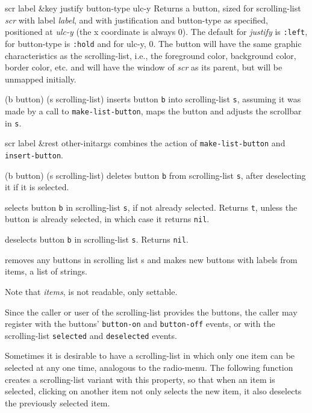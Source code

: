 \documentclass[twoside,openright,11pt]{report}
\newcommand{\tp}[1]{\texttt{#1}}
\begin{document}
{scr label \&key justify button-type ulc-y}
{Returns a button, sized for scrolling-list \emph{scr} with label
\emph{label}, and with justification and button-type as specified,
positioned at \emph{ulc-y} (the x coordinate is always 0).  The
default for \emph{justify} is \tp{:left}, for button-type is
\tp{:hold} and for ulc-y, 0.  The button will have the same
graphic characteristics as the scrolling-list, i.e., the foreground
color, background color, border color, etc. and will have the window
of \emph{scr} as its parent, but will be unmapped initially.}

{(b button) (s scrolling-list)}
{inserts button \tp{b} into scrolling-list \tp{s}, assuming it
was made by a call to \tp{make-list-button}, maps the button and
adjusts the scrollbar in \tp{s}.}

{scr label \&rest other-initargs}
{combines the action of \tp{make-list-button} and \tp{insert-button}.}

{(b button) (s scrolling-list)}
{deletes button \tp{b} from scrolling-list \tp{s}, after
deselecting it if it is selected.}

{selects button \tp{b} in scrolling-list \tp{s}, if not
already selected.  Returns \tp{t}, unless the button is already
selected, in which case it returns \tp{nil}.}

{deselects button \tp{b} in scrolling-list \tp{s}.  Returns
\tp{nil}.}

{removes any buttons in scrolling list s and makes new buttons with
labels from items, a list of strings.}

Note that \emph{items}, is not readable, only settable.

Since the caller or user of the scrolling-list provides the buttons,
the caller may register with the buttons' \tp{button-on} and
\tp{button-off} events, or with the scrolling-list
\tp{selected} and \tp{deselected} events.

Sometimes it is desirable to have a scrolling-list in which only one
item can be selected at any one time, analogous to the radio-menu.
The following function creates a scrolling-list variant with this
property, so that when an item is selected, clicking on another item
not only selects the new item, it also deselects the previously
selected item.
\end{document}
